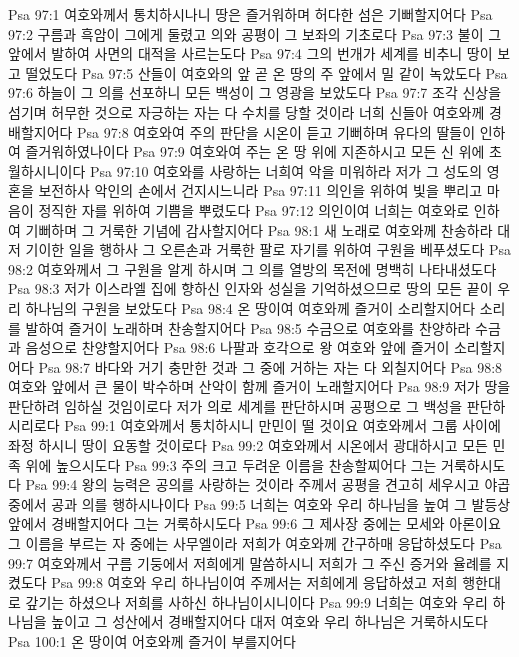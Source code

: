 Psa 97:1  여호와께서 통치하시나니 땅은 즐거워하며 허다한 섬은 기뻐할지어다
Psa 97:2  구름과 흑암이 그에게 둘렸고 의와 공평이 그 보좌의 기초로다
Psa 97:3  불이 그 앞에서 발하여 사면의 대적을 사르는도다
Psa 97:4  그의 번개가 세계를 비추니 땅이 보고 떨었도다
Psa 97:5  산들이 여호와의 앞 곧 온 땅의 주 앞에서 밀 같이 녹았도다
Psa 97:6  하늘이 그 의를 선포하니 모든 백성이 그 영광을 보았도다
Psa 97:7  조각 신상을 섬기며 허무한 것으로 자긍하는 자는 다 수치를 당할 것이라 너희 신들아 여호와께 경배할지어다
Psa 97:8  여호와여 주의 판단을 시온이 듣고 기뻐하며 유다의 딸들이 인하여 즐거워하였나이다
Psa 97:9  여호와여 주는 온 땅 위에 지존하시고 모든 신 위에 초월하시니이다
Psa 97:10  여호와를 사랑하는 너희여 악을 미워하라 저가 그 성도의 영혼을 보전하사 악인의 손에서 건지시느니라
Psa 97:11  의인을 위하여 빛을 뿌리고 마음이 정직한 자를 위하여 기쁨을 뿌렸도다
Psa 97:12  의인이여 너희는 여호와로 인하여 기뻐하며 그 거룩한 기념에 감사할지어다
Psa 98:1  새 노래로 여호와께 찬송하라 대저 기이한 일을 행하사 그 오른손과 거룩한 팔로 자기를 위하여 구원을 베푸셨도다
Psa 98:2  여호와께서 그 구원을 알게 하시며 그 의를 열방의 목전에 명백히 나타내셨도다
Psa 98:3  저가 이스라엘 집에 향하신 인자와 성실을 기억하셨으므로 땅의 모든 끝이 우리 하나님의 구원을 보았도다
Psa 98:4  온 땅이여 여호와께 즐거이 소리할지어다 소리를 발하여 즐거이 노래하며 찬송할지어다
Psa 98:5  수금으로 여호와를 찬양하라 수금과 음성으로 찬양할지어다
Psa 98:6  나팔과 호각으로 왕 여호와 앞에 즐거이 소리할지어다
Psa 98:7  바다와 거기 충만한 것과 그 중에 거하는 자는 다 외칠지어다
Psa 98:8  여호와 앞에서 큰 물이 박수하며 산악이 함께 즐거이 노래할지어다
Psa 98:9  저가 땅을 판단하려 임하실 것임이로다 저가 의로 세계를 판단하시며 공평으로 그 백성을 판단하시리로다
Psa 99:1  여호와께서 통치하시니 만민이 떨 것이요 여호와께서 그룹 사이에 좌정 하시니 땅이 요동할 것이로다
Psa 99:2  여호와께서 시온에서 광대하시고 모든 민족 위에 높으시도다
Psa 99:3  주의 크고 두려운 이름을 찬송할찌어다 그는 거룩하시도다
Psa 99:4  왕의 능력은 공의를 사랑하는 것이라 주께서 공평을 견고히 세우시고 야곱 중에서 공과 의를 행하시나이다
Psa 99:5  너희는 여호와 우리 하나님을 높여 그 발등상 앞에서 경배할지어다 그는 거룩하시도다
Psa 99:6  그 제사장 중에는 모세와 아론이요 그 이름을 부르는 자 중에는 사무엘이라 저희가 여호와께 간구하매 응답하셨도다
Psa 99:7  여호와께서 구름 기둥에서 저희에게 말씀하시니 저희가 그 주신 증거와 율례를 지켰도다
Psa 99:8  여호와 우리 하나님이여 주께서는 저희에게 응답하셨고 저희 행한대로 갚기는 하셨으나 저희를 사하신 하나님이시니이다
Psa 99:9  너희는 여호와 우리 하나님을 높이고 그 성산에서 경배할지어다 대저 여호와 우리 하나님은 거룩하시도다
Psa 100:1  온 땅이여 어호와께 즐거이 부를지어다
